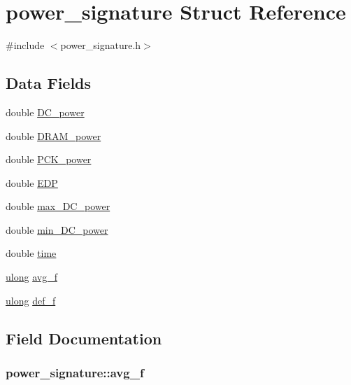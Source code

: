 \hypertarget{structpower__signature}{}\section{power\+\_\+signature Struct Reference}
\label{structpower__signature}


{\ttfamily \#include $<$power\+\_\+signature.\+h$>$}

\subsection*{Data Fields}
\begin{DoxyCompactItemize}
\item 
double \hyperlink{structpower__signature_a3cab3dbf2f5c8976c53a1a125bbccca1}{D\+C\+\_\+power}
\item 
double \hyperlink{structpower__signature_afe1388b7462f3e44a6df82ef81b51d4d}{D\+R\+A\+M\+\_\+power}
\item 
double \hyperlink{structpower__signature_a0cda14ce59849720a91b070f6f95421e}{P\+C\+K\+\_\+power}
\item 
double \hyperlink{structpower__signature_a001edb80cc61c438c4167cf5f0a23353}{E\+DP}
\item 
double \hyperlink{structpower__signature_a169edc8b760f9fd8596639891fa32c0e}{max\+\_\+\+D\+C\+\_\+power}
\item 
double \hyperlink{structpower__signature_ad591c63af76defd51436659718293448}{min\+\_\+\+D\+C\+\_\+power}
\item 
double \hyperlink{structpower__signature_a8b95e3a5849d61bb32ee86ee01f6a6da}{time}
\item 
\hyperlink{generic_8h_a718b4eb2652c286f4d42dc18a8e71a1a}{ulong} \hyperlink{structpower__signature_a18efdbc00587c228c2735c195a3901f5}{avg\+\_\+f}
\item 
\hyperlink{generic_8h_a718b4eb2652c286f4d42dc18a8e71a1a}{ulong} \hyperlink{structpower__signature_ad3219c2a2526b20419ca70ee35d69232}{def\+\_\+f}
\end{DoxyCompactItemize}


\subsection{Field Documentation}
\subsubsection[{\texorpdfstring{avg\+\_\+f}{avg_f}}]{ power\+\_\+signature\+::avg\+\_\+f}\hypertarget{structpower__signature_a18efdbc00587c228c2735c195a3901f5}{}\label{structpower__signature_a18efdbc00587c228c2735c195a3901f5}
